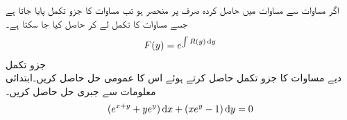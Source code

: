 اگر مساوات  سے مساوات  میں حاصل کردہ   صرف  پر منحصر ہو تب  مساوات  کا جزو تکمل پایا جاتا ہے جسے مساوات  کا تکمل لے کر حاصل کیا جا سکتا ہے۔
\begin{align}\label{مساوات_سادہ_اول_جزو_تکمل__مساوات_ب}
F(y)=e^{\int R(y) \dif y}
\end{align}
\quad جزو تکمل\\
دیے مساوات کا جزو تکمل حاصل کرتے ہوئے اس کا عمومی حل حاصل کریں۔ابتدائی معلومات  سے جبری حل حاصل کریں۔
\begin{align}\label{مساوات_سادہ_اول_مثال_جزو_تکمل}
(e^{x+y}+ye^y)\dif x+(xe^y-1)\dif y=0
\end{align}

